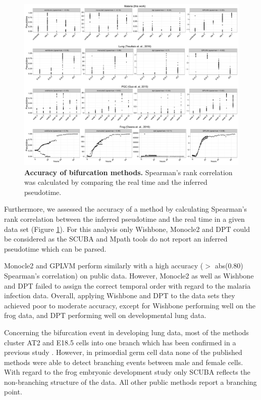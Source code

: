 \begin{figure}
    \centering
    \includegraphics[width=\textwidth]{"realtime_vs_pseudotime_accuracy"}
    \caption[Accuracy of bifurcation methods]{\textbf{Accuracy of bifurcation methods.} Spearman's rank correlation was calculated by comparing the real time and the inferred pseudotime.}
    \label{fig:real_vs_pseudo}
\end{figure}

Furthermore, we assessed the accuracy of a method by calculating Spearman's rank correlation between the inferred pseudotime and the real time in a given data set (Figure \ref{fig:real_vs_pseudo}). For this analysis only Wishbone, Monocle2 and DPT could be considered as the SCUBA and Mpath tools do not report an inferred pseudotime which can be parsed.

Monocle2 and GPLVM perform similarly with a high accuracy ($>$ abs(0.80) Spearman's correlation) on public data. However, Monocle2 as well as Wishbone and DPT failed to assign the correct temporal order with regard to the malaria infection data. Overall, applying Wishbone and DPT to the data sets they achieved poor to moderate accuracy, except for Wishbone performing well on the frog data, and DPT performing well on developmental lung data.

Concerning the bifurcation event in developing lung data, most of the methods cluster AT2 and E18.5  cells into one branch which has been confirmed in a previous study \cite{Treutlein2014-rz}. However, in primordial germ cell data none of the published methods were able to detect branching  events between male and female cells. With regard to the frog embryonic development study only SCUBA reflects the non-branching structure of the data. All other public methods report a branching point.

